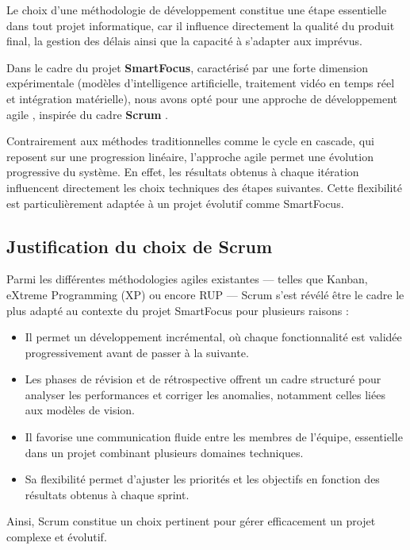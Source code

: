 Le choix d’une méthodologie de développement constitue une étape essentielle dans tout projet informatique, car il influence directement la qualité du produit final, la gestion des délais ainsi que la capacité à s’adapter aux imprévus.

Dans le cadre du projet \textbf{SmartFocus}, caractérisé par une forte dimension expérimentale (modèles d’intelligence artificielle, traitement vidéo en temps réel et intégration matérielle), nous avons opté pour une approche de développement agile \cite{agilemanifesto}, inspirée du cadre \textbf{Scrum} \cite{scrumguide}.

Contrairement aux méthodes traditionnelles comme le cycle en cascade, qui reposent sur une progression linéaire, l’approche agile permet une évolution progressive du système. En effet, les résultats obtenus à chaque itération influencent directement les choix techniques des étapes suivantes. Cette flexibilité est particulièrement adaptée à un projet évolutif comme SmartFocus.

\subsection{Justification du choix de Scrum}

Parmi les différentes méthodologies agiles existantes — telles que Kanban, eXtreme Programming (XP) ou encore \ac{RUP} — Scrum \cite{scrumguide} s’est révélé être le cadre le plus adapté au contexte du projet SmartFocus pour plusieurs raisons :

\begin{itemize}
    \item Il permet un développement incrémental, où chaque fonctionnalité est validée progressivement avant de passer à la suivante.
    \item Les phases de révision et de rétrospective offrent un cadre structuré pour analyser les performances et corriger les anomalies, notamment celles liées aux modèles de vision.
    \item Il favorise une communication fluide entre les membres de l’équipe, essentielle dans un projet combinant plusieurs domaines techniques.
    \item Sa flexibilité permet d’ajuster les priorités et les objectifs en fonction des résultats obtenus à chaque sprint.
\end{itemize}

Ainsi, Scrum constitue un choix pertinent pour gérer efficacement un projet complexe et évolutif.

